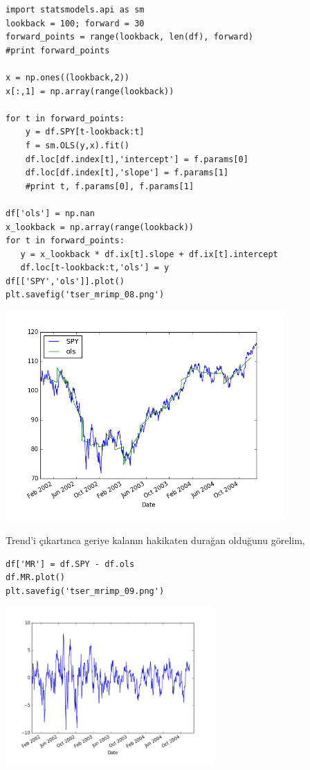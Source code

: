 \documentclass[12pt,fleqn]{article}\usepackage{../../common}
\begin{document}
\begin{verbatim}
import statsmodels.api as sm
lookback = 100; forward = 30
forward_points = range(lookback, len(df), forward)
#print forward_points

x = np.ones((lookback,2))
x[:,1] = np.array(range(lookback))

for t in forward_points:    
    y = df.SPY[t-lookback:t]
    f = sm.OLS(y,x).fit()
    df.loc[df.index[t],'intercept'] = f.params[0]
    df.loc[df.index[t],'slope'] = f.params[1]
    #print t, f.params[0], f.params[1]
    
df['ols'] = np.nan
x_lookback = np.array(range(lookback))
for t in forward_points:
   y = x_lookback * df.ix[t].slope + df.ix[t].intercept
   df.loc[t-lookback:t,'ols'] = y
df[['SPY','ols']].plot()
plt.savefig('tser_mrimp_08.png')
\end{verbatim}

\includegraphics[height=8cm]{tser_mrimp_08.png}

Trend'i çıkartınca geriye kalanın hakikaten durağan olduğunu görelim,

\begin{verbatim}
df['MR'] = df.SPY - df.ols
df.MR.plot()
plt.savefig('tser_mrimp_09.png')
\end{verbatim}

\includegraphics[height=6cm]{tser_mrimp_09.png}
\end{document}
